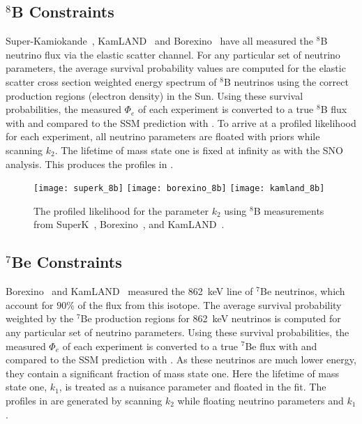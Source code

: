 \subsection{$^8$B Constraints}

Super-Kamiokande~\cite{superkiv}, KamLAND~\cite{kamland8b} and Borexino~\cite{borexino8b} have all measured the $^8$B neutrino flux via the elastic scatter channel. 
For any particular set of neutrino parameters, the average survival probability values are computed for the elastic scatter cross section weighted energy spectrum of $^8$B neutrinos using the correct production regions (electron density) in the Sun. 
Using these survival probabilities, the measured $\Phi_e$ of each experiment is converted to a true $^8$B flux with  and compared to the SSM prediction with .
To arrive at a profiled likelihood for each experiment, all neutrino parameters are floated with priors while scanning $k_2$. The lifetime of mass state one is fixed at infinity as with the SNO analysis. 
This produces the profiles in .

\begin{figure}
\centering
\texttt{[image: superk\_8b]}
\texttt{[image: borexino\_8b]}
\texttt{[image: kamland\_8b]}
\caption{The profiled likelihood for the parameter $k_2$ using $^8$B measurements from SuperK~\cite{superkiv}, Borexino~\cite{borexino8b}, and KamLAND~\cite{kamland8b}.}
\label{fig:8b_profiles}
\end{figure}

\subsection{$^7$Be Constraints}

Borexino~\cite{borexino7be} and KamLAND~\cite{kamland7be} measured the 862~keV line of $^7$Be neutrinos, which account for $90\%$ of the flux from this isotope. 
The average survival probability weighted by the $^7$Be production regions for 862~keV neutrinos is computed for any particular set of neutrino parameters.
Using these survival probabilities, the measured $\Phi_e$ of each experiment is converted to a true $^7$Be flux with  and compared to the SSM prediction with . 
As these neutrinos are much lower energy, they contain a significant fraction of mass state one. 
Here the lifetime of mass state one, $k_1$, is treated as a nuisance parameter and floated in the fit. 
The profiles in  are generated by scanning $k_2$ while floating neutrino parameters and $k_1$.

